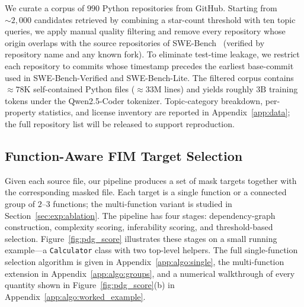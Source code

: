 We curate a corpus of $990$ Python repositories from GitHub. Starting
from $\sim\!2{,}000$ candidates retrieved by combining a star-count
threshold with ten topic queries, we apply manual quality filtering and
remove every repository whose origin overlaps with the source
repositories of SWE-Bench~\citep{swebench} (verified by repository name
and any known fork). To eliminate test-time leakage, we restrict each
repository to commits whose timestamp precedes the earliest base-commit
used in SWE-Bench-Verified and SWE-Bench-Lite. The filtered corpus
contains $\approx\!78\mathrm{K}$ self-contained Python files
($\approx\!33\mathrm{M}$ lines) and yields roughly $3\mathrm{B}$ training
tokens under the Qwen2.5-Coder tokenizer. Topic-category breakdown,
per-property statistics, and license inventory are reported in
Appendix~\ref{app:data}; the full repository list will be released to
support reproduction.

\vspace{-0.5ex}
\subsection{Function-Aware FIM Target Selection}
\label{sec:method:selection}

Given each source file, our pipeline produces a set of mask targets
together with the corresponding masked file. Each target is a single
function or a connected group of $2$--$3$ functions; the multi-function
variant is studied in Section~\ref{sec:exp:ablation}. The pipeline has
four stages: dependency-graph construction, complexity scoring,
inferability scoring, and threshold-based selection. Figure~\ref{fig:pdg_score}
illustrates these stages on a small running example---a
\texttt{Calculator} class with two top-level helpers. The full
single-function selection algorithm is given in
Appendix~\ref{app:algo:single}, the multi-function extension in
Appendix~\ref{app:algo:groups}, and a numerical walkthrough of every
quantity shown in Figure~\ref{fig:pdg_score}(b) in
Appendix~\ref{app:algo:worked_example}.

